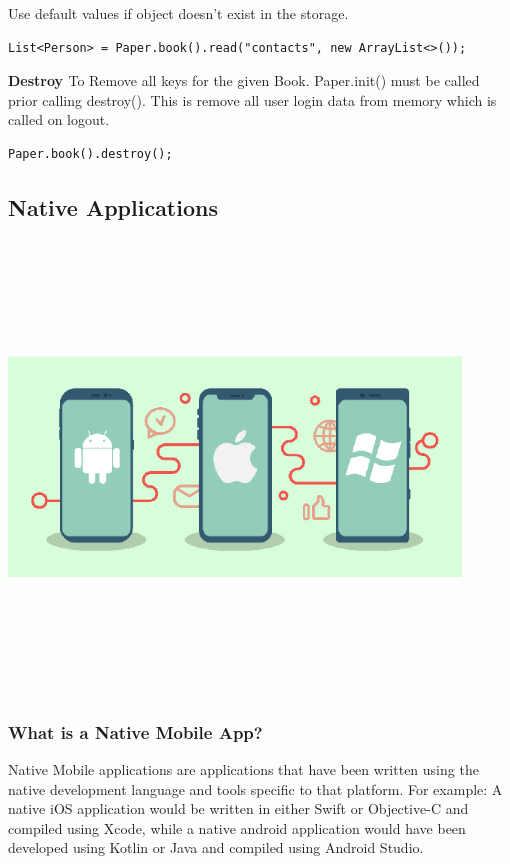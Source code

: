 Use default values if object doesn't exist in the storage.
\begin{verbatim}
List<Person> = Paper.book().read("contacts", new ArrayList<>());
\end{verbatim}

\textbf{Destroy \cite{paper}}
To Remove all keys for the given Book. Paper.init() must be called prior calling destroy().
This is remove all user login data from memory which is called on logout.
\begin{verbatim}
Paper.book().destroy();
\end{verbatim}
\subsection{Native Applications}
\par
\medskip
\begin{center}
    \includegraphics[width=12cm,height=12cm,keepaspectratio]{Images/nativeapp2.png}
\end{center}
\subsubsection{What is a Native Mobile App?}
Native Mobile applications are applications that have been written using the native development language and tools specific to that platform. For example: A native iOS application would be written in either Swift or Objective-C and compiled using Xcode, while a native android application would have been developed using Kotlin or Java and compiled using Android Studio.\newline

